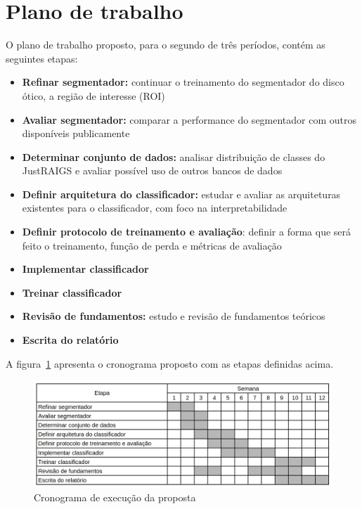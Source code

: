 \documentclass[12pt]{article}
\begin{document}

\bigskip

\section{Plano de trabalho}
\label{sec:schedule}

O plano de trabalho proposto, para o segundo de três períodos, contém as seguintes etapas:
\begin{itemize}
    \item \textbf{Refinar segmentador:} continuar o treinamento do segmentador do disco ótico, a região de interesse (ROI)
    \item \textbf{Avaliar segmentador:} comparar a performance do segmentador com outros disponíveis publicamente
    \item \textbf{Determinar conjunto de dados:} analisar distribuição de classes do JustRAIGS e avaliar possível uso de outros bancos de dados
    \item \textbf{Definir arquitetura do classificador:} estudar e avaliar as arquiteturas existentes para o classificador, com foco na interpretabilidade
    \item \textbf{Definir protocolo de treinamento e avaliação}: definir a forma que será feito o treinamento, função de perda e métricas de avaliação
    \item \textbf{Implementar classificador}
    \item \textbf{Treinar classificador}
    \item \textbf{Revisão de fundamentos:} estudo e revisão de fundamentos teóricos
    \item \textbf{Escrita do relatório}
\end{itemize}

A figura~\ref{fig:crono} apresenta o cronograma proposto com as etapas definidas acima.

\begin{figure}[htb]
 \centering
 \includegraphics[width=1.0\textwidth]{images/crono_q2.png}
 \caption{Cronograma de execução da proposta}
 \label{fig:crono}
\end{figure}
\end{document}
